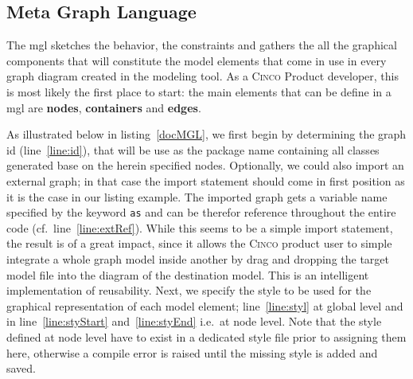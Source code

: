\subsection{Meta Graph Language}\label{sec:MGL}

The \acrfull{mgl} sketches the behavior, the constraints and gathers the all the graphical components that will constitute the model elements that come in use in every graph diagram created in the modeling tool. As a \textsc{Cinco} Product developer, this is most likely the first place to start: the main elements that can be define in a \acrshort{mgl} are \textbf{nodes}, \textbf{containers} and \textbf{edges}. 

As illustrated below in listing~\ref{docMGL}, we first begin by determining the graph id (line~\ref{line:id}), that will be use as the package name containing all classes generated base on the herein specified nodes. Optionally, we could also import an external graph; in that case the import statement should come in first position as it is the case in our listing example. The imported graph gets a variable name specified by the keyword \lstinline[language=MGL]{as} and can be therefor reference throughout the entire code (cf.\ line~\ref{line:extRef}). While this seems to be a simple import statement, the result is of a great impact, since it allows the \textsc{Cinco} product user to simple integrate a whole graph model inside another by drag and dropping the target model file into the diagram of the destination model. This is an intelligent implementation of reusability. Next, we specify the style to be used for the graphical representation of each model element; line~\ref{line:styl} at global level and in line~\ref{line:styStart} and~\ref{line:styEnd} i.e.\ at node level. Note that the style defined at node level have to exist in a dedicated style file prior to assigning them here, otherwise a compile error is raised until the missing style is added and saved.

